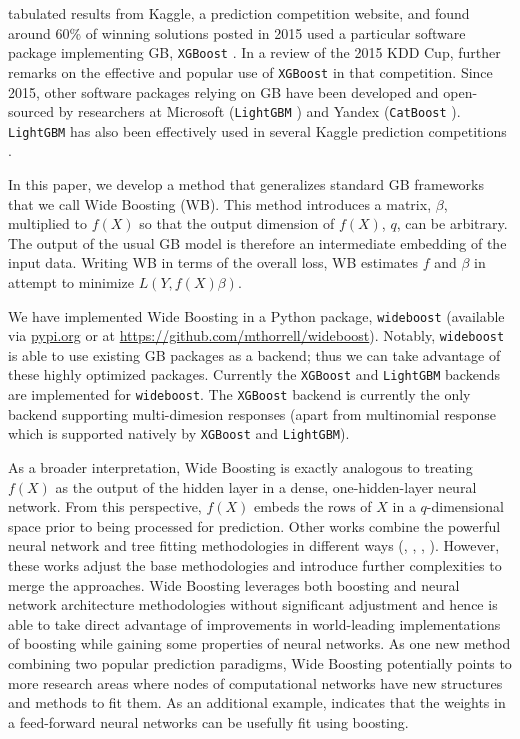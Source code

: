 \documentclass{article}
\begin{document}
\cite{xgboost} tabulated results from Kaggle, a prediction competition website, and found around 60\% of winning solutions posted in 2015 used a particular software package implementing GB, \texttt{XGBoost} \citep{xgboost}. In a review of the 2015 KDD Cup, \cite{kddreview} further remarks on the effective and popular use of \texttt{XGBoost} in that competition. Since 2015, other software packages relying on GB have been developed and open-sourced by researchers at Microsoft (\texttt{LightGBM} \citep{lightgbm}) and Yandex (\texttt{CatBoost} \citep{catboost}). \texttt{LightGBM} has also been effectively used in several Kaggle prediction competitions \cite{microsoft}.

In this paper, we develop a method that generalizes standard GB frameworks that we call Wide Boosting (WB). This method introduces a matrix, $\beta$, multiplied to $f(X)$ so that the output dimension of $f(X)$, $q$, can be arbitrary. The output of the usual GB model is therefore an intermediate embedding of the input data. Writing WB in terms of the overall loss, WB estimates $f$ and $\beta$ in attempt to minimize $L(Y, f(X)\beta)$.

We have implemented Wide Boosting in a Python package, \texttt{wideboost} (available via \url{pypi.org} or at \url{https://github.com/mthorrell/wideboost}). Notably, \texttt{wideboost} is able to use existing GB packages as a backend; thus we can take advantage of these highly optimized packages. Currently the \texttt{XGBoost} and \texttt{LightGBM} backends are implemented for \texttt{wideboost}. The \texttt{XGBoost} backend is currently the only backend supporting multi-dimesion responses (apart from multinomial response which is supported natively by \texttt{XGBoost} and \texttt{LightGBM}).

As a broader interpretation, Wide Boosting is exactly analogous to treating $f(X)$ as the output of the hidden layer in a dense, one-hidden-layer neural network. From this perspective, $f(X)$ embeds the rows of $X$ in a $q$-dimensional space prior to being processed for prediction. Other works combine the powerful neural network and tree fitting methodologies in different ways (\citep{dndf}, \citep{deepgbm}, \citep{ndt}, \citep{node}). However, these works adjust the base methodologies and introduce further complexities to merge the approaches. Wide Boosting leverages both boosting and neural network architecture methodologies without significant adjustment and hence is able to take direct advantage of improvements in world-leading implementations of boosting while gaining some properties of neural networks. As one new method combining two popular prediction paradigms, Wide Boosting potentially points to more research areas where nodes of computational networks have new structures and methods to fit them. As an additional example, \cite{blog} indicates that the weights in a feed-forward neural networks can be usefully fit using boosting. 
\end{document}
